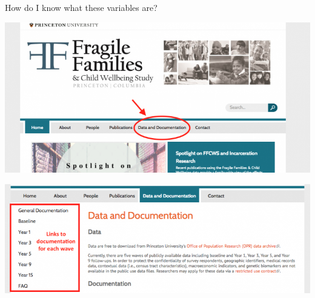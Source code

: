 \documentclass[aspectratio=169]{beamer}
\begin{document}
%
%
\begin{frame}

How do I know what these variables are? 

\end{frame}
\begin{frame}

\centering\includegraphics[width = .8\textwidth]{figures/Doc1}

\end{frame}
\begin{frame}

\centering\includegraphics[width = .8\textwidth]{figures/Doc2}

\end{frame}
\end{document}
